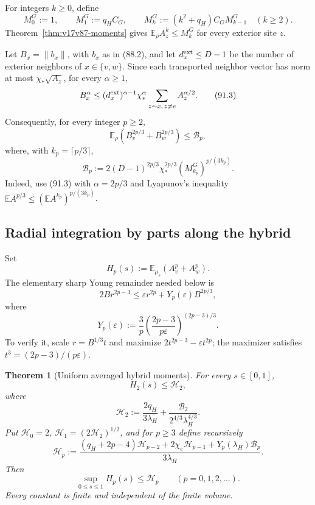 \documentclass[11pt]{article}
\newtheorem{theorem}{Theorem}[section]
\theoremstyle{remark}
\begin{document}
For integers \(k\geq0\), define
\[
 M_0^G:=1,
 \qquad M_1^G:=q_HC_G,
 \qquad
 M_k^G:=(k^2+q_H)C_GM_{k-1}^G\quad(k\geq2).          \tag{91.2}
\]
Theorem~\ref{thm:v17v87-moments} gives
\(\mathbb E_\rho A_z^k\leq M_k^G\) for every exterior site \(z\).

Let \(B_x=\|b_x\|\), with \(b_x\) as in (88.2), and let
\(d_x^{\rm ext}\leq D-1\) be the number of exterior neighbors of
\(x\in\{v,w\}\).  Since each transported neighbor vector has norm at
most \(\chi_*\sqrt{A_z}\), for every \(\alpha\geq1\),
\[
 B_x^\alpha
 \leq(d_x^{\rm ext})^{\alpha-1}\chi_*^\alpha
      \sum_{z\sim x,\,z\ne e} A_z^{\alpha/2}.        \tag{91.3}
\]
Consequently, for every integer \(p\geq2\),
\[
\boxed{
 \mathbb E_\rho(B_v^{2p/3}+B_w^{2p/3})
 \leq\mathcal B_p,}                                 \tag{91.4}
\]
where, with \(k_p=\lceil p/3\rceil\),
\[
 \mathcal B_p
 :=2(D-1)^{2p/3}\chi_*^{2p/3}
       (M_{k_p}^G)^{p/(3k_p)}.                       \tag{91.5}
\]
Indeed, use (91.3) with \(\alpha=2p/3\) and Lyapunov's inequality
\(\mathbb EA^{p/3}\leq(\mathbb EA^{k_p})^{p/(3k_p)}\).

\subsection{Radial integration by parts along the hybrid}

Set
\[
 H_p(s):=\mathbb E_{\mu_s}(A_v^p+A_w^p).             \tag{91.6}
\]
The elementary sharp Young remainder needed below is
\[
 2Br^{2p-3}\leq\varepsilon r^{2p}
 +Y_p(\varepsilon)B^{2p/3},                          \tag{91.7}
\]
where
\[
 Y_p(\varepsilon)
 :=\frac3p\left(\frac{2p-3}{p\varepsilon}
          \right)^{(2p-3)/3}.                       \tag{91.8}
\]
To verify it, scale \(r=B^{1/3}t\) and maximize
\(2t^{2p-3}-\varepsilon t^{2p}\); the maximizer satisfies
\(t^3=(2p-3)/(p\varepsilon)\).

\begin{theorem}[Uniform averaged hybrid moments]
\label{thm:v17v91-hybrid-moments}
For every \(s\in[0,1]\),
\[
 H_2(s)\leq\mathcal H_2,                             \tag{91.9}
\]
where
\[
\boxed{
 \mathcal H_2
 :=\frac{2q_H}{3\lambda_H}
 +\frac{\mathcal B_2}
        {2^{4/3}\lambda_H^{4/3}}.}                  \tag{91.10}
\]
Put \(\mathcal H_0=2\),
\(\mathcal H_1=(2\mathcal H_2)^{1/2}\), and for
\(p\geq3\) define recursively
\[
\boxed{
 \mathcal H_p
 :=\frac{(q_H+2p-4)\mathcal H_{p-2}
          +2\chi_e\mathcal H_{p-1}
          +Y_p(\lambda_H)\mathcal B_p}
         {3\lambda_H}.}                             \tag{91.11}
\]
Then
\[
 \sup_{0\leq s\leq1}H_p(s)\leq\mathcal H_p
 \qquad(p=0,1,2,\ldots).                            \tag{91.12}
\]
Every constant is finite and independent of the finite volume.
\end{theorem}
\end{document}
